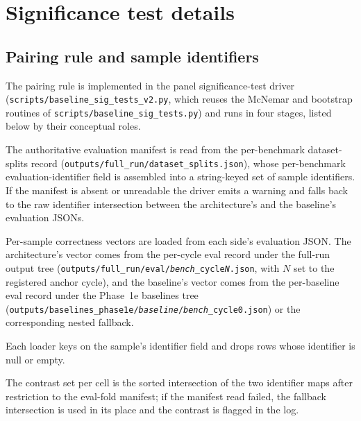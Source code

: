 
\chapter{Significance test details}
\label{app:significance}

\section{Pairing rule and sample identifiers}
\label{app:sig-pairing}

The pairing rule is implemented in the panel significance-test driver (\texttt{scripts/\allowbreak baseline\_sig\_tests\_v2.py}, which reuses the McNemar and bootstrap routines of \texttt{scripts/\allowbreak baseline\_sig\_tests.py}) and runs in four stages, listed below by their conceptual roles.

\begin{description}
\setlength{\itemsep}{2pt}
\item[Manifest restriction.] The authoritative evaluation manifest is read from the per-benchmark dataset-splits record (\texttt{outputs/full\_run/\allowbreak dataset\_splits.json}), whose per-benchmark evaluation-identifier field is assembled into a string-keyed set of sample identifiers. If the manifest is absent or unreadable the driver emits a warning and falls back to the raw identifier intersection between the architecture's and the baseline's evaluation JSONs.
\item[Vector load.] Per-sample correctness vectors are loaded from each side's evaluation JSON. The architecture's vector comes from the per-cycle eval record under the full-run output tree (\texttt{outputs/full\_run/eval/\allowbreak \textit{bench}\_cycle\textit{N}.json}, with $N$ set to the registered anchor cycle), and the baseline's vector comes from the per-baseline eval record under the Phase~1e baselines tree (\texttt{outputs/\allowbreak baselines\_phase1e/\allowbreak \textit{baseline}/\allowbreak \textit{bench}\_cycle0.json}) or the corresponding nested fallback.
\item[Identifier intersection.] Each loader keys on the sample's identifier field and drops rows whose identifier is null or empty.
\item[Fallback rule.] The contrast set per cell is the sorted intersection of the two identifier maps after restriction to the eval-fold manifest; if the manifest read failed, the fallback intersection is used in its place and the contrast is flagged in the log.
\end{description}

